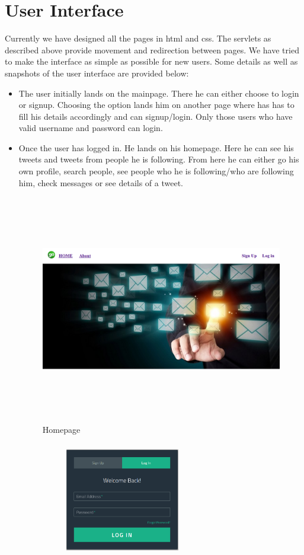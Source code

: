 \documentclass[a4paper]{article}
\begin{document}
\section*{{User Interface}}
Currently we have designed all the pages in html and css. The servlets as described above provide movement and redirection between pages. We have tried to make the interface as simple as possible for new users. Some details as well as snapshots of the user interface are provided below:
\begin{itemize}
\item The user initially lands on the mainpage. There he can either choose to login or signup. Choosing the option lands him on another page where has has to fill his details accordingly and can signup/login. Only those users who have valid username and password can login.\\
\item Once the user has logged in. He lands on his homepage. Here he can see his tweets and tweets from people he is following. From here he can either go his own profile, search people, see people who he is following/who are following him, check messages or see details of a tweet.\\
\begin{figure}
\includegraphics[width=15cm, height=10cm]{homepage.png}
\caption{Homepage}
\end{figure}
\begin{figure}
\centering
\begin{subfigure}{.5\textwidth}
  \centering
  \includegraphics[width=5cm,height=5cm]{login_db.png}

\end{subfigure}
\end{figure}
\end{itemize}
\end{document}
